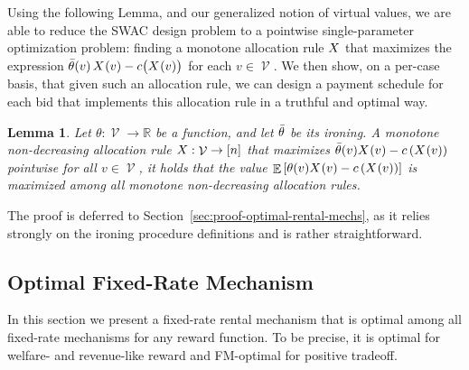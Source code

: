 \documentclass[11pt,letterpaper]{article}
\newcommand{\sqbr}[1]{\left[ #1 \right]}
\newcommand{\brackets}[1]{\left( #1 \right)}
\newcommand{\fr}{fixed-rate\xspace}
\newcommand{\FR}{Fixed-Rate\xspace}
\newcommand{\swac}{SWAC\xspace}
\newcommand{\swacs}{SWACs\xspace}
\newcommand{\reals}{\mathbb{R}}
\DeclareMathOperator*{\E}{\bb{E}}
\newcommand{\bb}[1]{\mathbb{#1}}
\DeclareMathOperator{\D}{\mathcal{D}}
\renewcommand{\S}{\mathcal{S}}
\DeclareMathOperator{\V}{\mathcal{V}}
\newcommand{\g}{g}
\theoremstyle{plain}
\newtheorem{lemma}[theorem]{Lemma}
\begin{document}
Using the following Lemma, and our generalized notion of virtual values, we are able to reduce  the \swac design problem to a pointwise single-parameter optimization problem: 
finding a monotone allocation rule $\alloc$ that maximizes the expression ${\Bar{\theta}(v)\,\x{v}-c\bigl(\x{v}\bigr)}$ 
for each $v\in\V$.
We then show,
on a per-case basis,
that given such an allocation rule, we can design a payment schedule for each bid that implements this allocation rule in a truthful and optimal way.

\begin{lemma}\label{lemma:irn-maximizer-maximizes-expected}
    Let $\theta:\V\rightarrow\reals$ be a function, and let $\Bar{\theta}$ be its ironing. A monotone non-decreasing allocation rule $\alloc:\V\rightarrow\sqbr{n}$ that maximizes $\Bar{\theta}(v)\x{v}-c\brackets{\x{v}}$ pointwise for all $v\in\V$, it holds that the value $\E\sqbr{\theta(v)\x{v}-c\brackets{\x{v}}}$ is maximized among all monotone non-decreasing allocation rules.
\end{lemma}

The proof is deferred to Section~\ref{sec:proof-optimal-rental-mechs}, as it relies strongly on the ironing procedure definitions and is rather straightforward.

\subsection{Optimal \FR Mechanism}\label{sec:fr-mech}

In this section we present a \fr rental mechanism that is optimal among all \fr mechanisms for any reward function. To be precise,
it is optimal for welfare- and revenue-like reward and FM-optimal for positive tradeoff.
\end{document}
